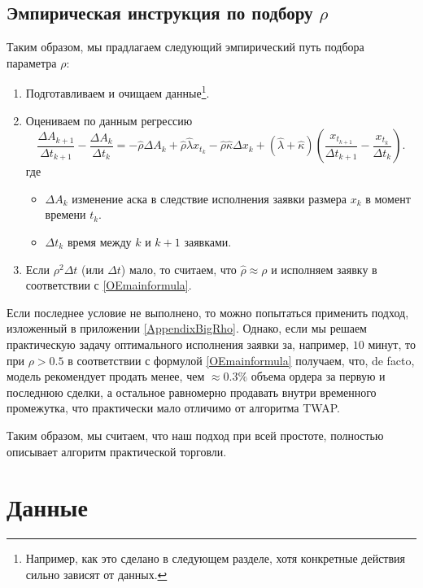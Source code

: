 \subsection{Эмпирическая инструкция по подбору $\rho$}
Таким образом, мы прадлагаем следующий эмпирический путь подбора параметра $\rho$:
\begin{enumerate}
    \item Подготавливаем и очищаем данные\footnote{Например, как это сделано в следующем разделе, 
    хотя конкретные действия сильно зависят от данных.}. 
    \item Оцениваем по данным регрессию
    \begin{equation*}
        \frac{\Delta A_{k+1}}{\Delta t_{k+1}} - \frac{\Delta A_{k}}{\Delta t_{k}} =
        -\hat \rho \Delta A_k + \hat \rho \hat \lambda x_{t_k} - \hat \rho \hat \kappa \Delta x_k
        + (\hat \lambda + \hat \kappa) \left(\frac{x_{t_{k+1}}}{\Delta t_{k+1}} - \frac{x_{t_k}}{\Delta t_{k}}\right).
    \end{equation*}
    где
    \begin{itemize}
        \item $\Delta A_{k}$ изменение аска в следствие исполнения заявки размера $x_k$ в момент времени $t_k$.
        \item $\Delta t_{k}$ время между $k$ и $k + 1$ заявками.
    \end{itemize}
    \item Если $\rho^2 \Delta t$ (или $\Delta t$) мало, то считаем, 
    что $\hat \rho \approx \rho$ и исполняем заявку в соответствии с \eqref{OEmainformula}.
\end{enumerate}
Если последнее условие не выполнено, то можно попытаться применить подход, изложенный в приложении \ref{AppendixBigRho}.
Однако, если мы решаем практическую задачу оптимального исполнения заявки за, например, $10$ минут, то при $\rho > 0.5$ 
в соответствии с формулой \eqref{OEmainformula} получаем, что, de facto, модель рекомендует продать менее, чем $\approx 0.3\%$ объема
ордера за первую и последнюю сделки, а остальное равномерно продавать внутри временного промежутка, что практически мало отличимо от 
алгоритма TWAP. 
\par
Таким образом, мы считаем, что наш подход при всей простоте, полностью описывает алгоритм практической торговли. 


\section{Данные}
